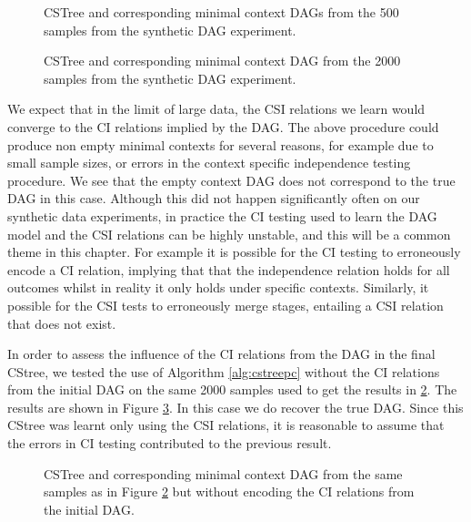 \documentclass{tufte-book}
\begin{document}
\begin{figure}[!h]\label{fig:mc_dags500}
   \begin{floatrow}
%
 \caption{CSTree and corresponding minimal context DAGs from the 500 samples from the synthetic DAG experiment.}
        
   \end{floatrow}
\end{figure}


\begin{figure}[!h]\label{fig:mc_dags2000}
   \begin{floatrow}
%
 \caption{CSTree and corresponding minimal context DAG from the 2000 samples from the synthetic DAG experiment.}
        
   \end{floatrow}
\end{figure}


We expect that in the limit of large data, the CSI relations we learn would converge to the CI relations implied by the DAG. The above procedure could produce non empty minimal contexts for several reasons, for example due to small sample sizes, or errors in the context specific independence testing procedure. We see that the empty context DAG does not correspond to the true DAG in this case. Although this did not happen significantly often on our synthetic data experiments, in practice the CI testing used to learn the DAG model and the CSI relations can be highly unstable, and this will be a common theme in this chapter. For example it is possible for the CI testing to erroneously encode a CI relation, implying that that the independence relation holds for all outcomes whilst in reality it only holds under specific contexts. Similarly, it possible for the CSI tests to erroneously merge stages, entailing a CSI relation that does not exist. 


In order to assess the influence of the CI relations from the DAG in the final CStree, we tested the use of Algorithm \ref{alg:cstreepc} without the CI relations from the initial DAG on the same 2000 samples used to get the results in \ref{fig:mc_dags2000}. The results are shown in Figure \ref{fig:mcdags_csi}. In this case we do recover the true DAG. Since this CStree was learnt only using the CSI relations, it is reasonable to assume that the errors in CI testing contributed to the previous result.

\begin{figure}[!h]\label{fig:mcdags_csi}
   \begin{floatrow}
%
 \caption{CSTree and corresponding minimal context DAG from the same samples as in Figure \ref{fig:mc_dags2000} but without encoding the CI relations from the initial DAG.}
        
   \end{floatrow}
\end{figure}
\end{document}

